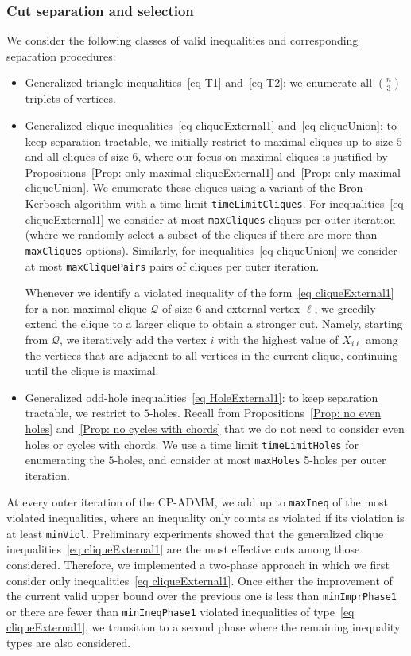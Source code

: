 \documentclass[11pt, a4paper]{article}
\newcommand{\mc}{\mathcal}
\begin{document}
\subsubsection{Cut separation and selection} \label{Sec: Cut separation and selection}
We consider the following classes of valid inequalities and corresponding separation procedures:
\begin{itemize}
    \item Generalized triangle inequalities~\eqref{eq T1} and~\eqref{eq T2}: we enumerate all $\binom{n}{3}$ triplets of vertices.
    \item Generalized clique inequalities~\eqref{eq cliqueExternal1} and~\eqref{eq cliqueUnion}: to keep separation tractable, we initially restrict to maximal cliques up to size $5$ and all cliques of size $6$, where our focus on maximal cliques is justified by Propositions~\ref{Prop: only maximal cliqueExternal1} and~\ref{Prop: only maximal cliqueUnion}. 
    We enumerate these cliques using a variant of the Bron-Kerbosch algorithm \cite{Bron1973MaxCliques} with a time limit \texttt{timeLimitCliques}.
    For inequalities~\eqref{eq cliqueExternal1} we consider at most \texttt{maxCliques} cliques per {outer iteration} (where we randomly select a subset of the cliques if there are more than \texttt{maxCliques} options).
    Similarly, for inequalities~\eqref{eq cliqueUnion} we consider at most \texttt{maxCliquePairs} pairs of cliques per outer iteration.

    Whenever we identify a violated inequality of the form~\eqref{eq cliqueExternal1} for a non-maximal clique $\mc{Q}$ of size $6$ and external vertex $\ell$, we greedily extend the clique to a larger clique to obtain a stronger cut.     
    Namely, starting from $\mc{Q}$, we iteratively add the vertex $i$ with the highest value of $X_{i \ell}$ among the vertices that are adjacent to all vertices in the current clique, continuing until the clique is maximal.
    \item Generalized odd-hole inequalities~\eqref{eq HoleExternal1}: to keep separation tractable, we restrict to $5$-holes. 
    Recall from Propositions~\ref{Prop: no even holes} and~\ref{Prop: no cycles with chords} that we do not need to consider even holes or cycles with chords. 
    We use a time limit \texttt{timeLimitHoles} for enumerating the $5$-holes, and consider at most \texttt{maxHoles} 5-holes per outer iteration.
\end{itemize}
At every outer iteration of the CP-ADMM, we add up to \texttt{maxIneq} of the most violated inequalities, where an inequality only counts as violated if its violation is at least \texttt{minViol}.
Preliminary experiments showed that the generalized clique inequalities~\eqref{eq cliqueExternal1} are the most effective cuts among those considered. 
Therefore, we implemented a two-phase approach in which we first consider only inequalities~\eqref{eq cliqueExternal1}. 
Once either the improvement of the current valid upper bound over the previous one is less than \texttt{minImprPhase1} or there are fewer than \texttt{minIneqPhase1} violated inequalities of type~\eqref{eq cliqueExternal1}, we transition to a second phase where the remaining inequality types are also considered.
\end{document}
